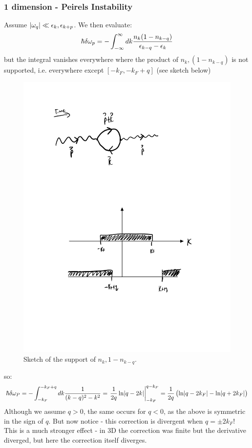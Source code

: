 \subsubsection{1 dimension - Peirels Instability}
Assume $\lvert \omega_q \rvert \ll \epsilon_k, \epsilon_{k+p}$. We then evaluate:
\begin{equation}
    \hbar \delta \omega_p = -\int_{-\infty}^\infty dk \frac{n_k(1 - n_{k-q})}{\epsilon_{k - q} - \epsilon_k}
\end{equation}
but the integral vanishes everywhere where the product of $n_k, (1 - n_{k-q})$ is not supported, i.e. everywhere except $[-k_F, -k_F + q]$ (see sketch below)

\begin{figure}[htbp]
    \centering
    \includegraphics[scale=0.6]{Images/fig-peirelssupport.pdf}
    \caption{Sketch of the support of $n_k, 1 - n_{k-q}$.}
    \label{fig-peirelssupport}
\end{figure}

so:
\begin{equation}
    \hbar \delta \omega_P =  -\int_{-k_F}^{-k_F + q}dk \frac{1}{(k - q)^2 - k^2} = \left.\frac{1}{2q}\ln\lvert q - 2k \rvert\right|_{-k_F}^{q - k_F} = \frac{1}{2q}\left(\ln\lvert q - 2k_F \rvert - \ln\lvert q + 2k_F \rvert\right)
\end{equation}
Although we assume $q > 0$, the same occurs for $q < 0$, as the above is symmetric in the sign of $q$. But now notice - this correction is divergent when $q = \pm 2k_F$! This is a much stronger effect - in 3D the correction was finite but the derivative diverged, but here the correction itself diverges.

